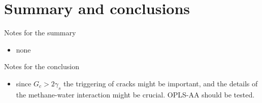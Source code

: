 \chapter{Summary and conclusions}

Notes for the summary
\begin{itemize}
\item none
\end{itemize}

Notes for the conclusion

\begin{itemize}
\item since $G_c > 2\gamma_s$ the triggering of cracks might be important, and the details of the methane-water interaction might be crucial. OPLS-AA should be tested.
\end{itemize}